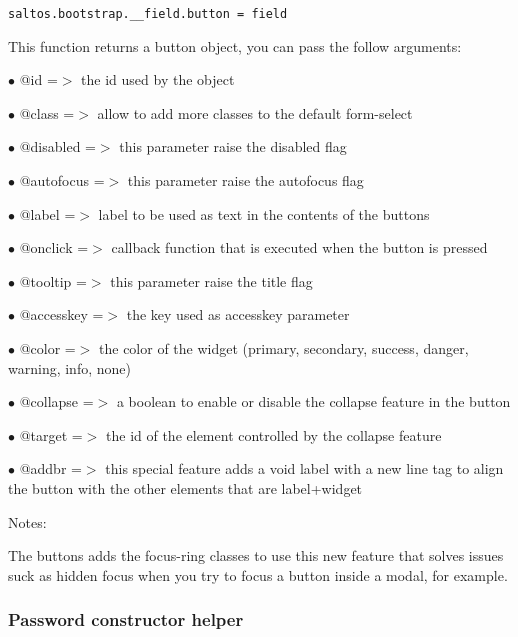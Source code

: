 \documentclass[a4paper]{article}
\begin{document}
\begin{lstlisting}
saltos.bootstrap.__field.button = field
\end{lstlisting}

This function returns a button object, you can pass the follow arguments:

\begin{compactitem}
\item[\color{myblue}$\bullet$] @id        =$>$ the id used by the object
\item[\color{myblue}$\bullet$] @class     =$>$ allow to add more classes to the default form-select
\item[\color{myblue}$\bullet$] @disabled  =$>$ this parameter raise the disabled flag
\item[\color{myblue}$\bullet$] @autofocus =$>$ this parameter raise the autofocus flag
\item[\color{myblue}$\bullet$] @label     =$>$ label to be used as text in the contents of the buttons
\item[\color{myblue}$\bullet$] @onclick   =$>$ callback function that is executed when the button is pressed
\item[\color{myblue}$\bullet$] @tooltip   =$>$ this parameter raise the title flag
\item[\color{myblue}$\bullet$] @accesskey =$>$ the key used as accesskey parameter
\item[\color{myblue}$\bullet$] @color     =$>$ the color of the widget (primary, secondary, success, danger, warning, info, none)
\item[\color{myblue}$\bullet$] @collapse  =$>$ a boolean to enable or disable the collapse feature in the button
\item[\color{myblue}$\bullet$] @target    =$>$ the id of the element controlled by the collapse feature
\item[\color{myblue}$\bullet$] @addbr     =$>$ this special feature adds a void label with a new line tag to align the button with
              the other elements that are label+widget
\end{compactitem}

Notes:

The buttons adds the focus-ring classes to use this new feature that solves issues suck as
hidden focus when you try to focus a button inside a modal, for example.

\hypertarget{toc626}{}
\subsubsection{Password constructor helper}
\end{document}
